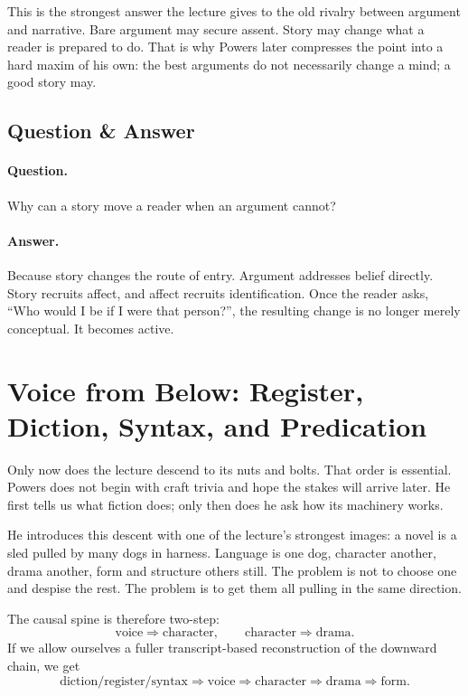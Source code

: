 This is the strongest answer the lecture gives to the old rivalry between argument and narrative. Bare argument may secure assent. Story may change what a reader is prepared to do. That is why Powers later compresses the point into a hard maxim of his own: the best arguments do not necessarily change a mind; a good story may.

\subsection{Question \& Answer}

\paragraph{Question.} Why can a story move a reader when an argument cannot?

\paragraph{Answer.} Because story changes the route of entry. Argument addresses belief directly. Story recruits affect, and affect recruits identification. Once the reader asks, ``Who would I be if I were that person?'', the resulting change is no longer merely conceptual. It becomes active.

\section{Voice from Below: Register, Diction, Syntax, and Predication}

Only now does the lecture descend to its nuts and bolts. That order is essential. Powers does not begin with craft trivia and hope the stakes will arrive later. He first tells us what fiction does; only then does he ask how its machinery works.

He introduces this descent with one of the lecture's strongest images: a novel is a sled pulled by many dogs in harness. Language is one dog, character another, drama another, form and structure others still. The problem is not to choose one and despise the rest. The problem is to get them all pulling in the same direction.

The causal spine is therefore two-step:
\begin{equation}
\text{voice} \Rightarrow \text{character},\qquad
\text{character} \Rightarrow \text{drama}.
\end{equation}
If we allow ourselves a fuller transcript-based reconstruction of the downward chain, we get
\begin{equation}
\text{diction/register/syntax} \Rightarrow \text{voice} \Rightarrow \text{character} \Rightarrow \text{drama} \Rightarrow \text{form}.
\end{equation}

